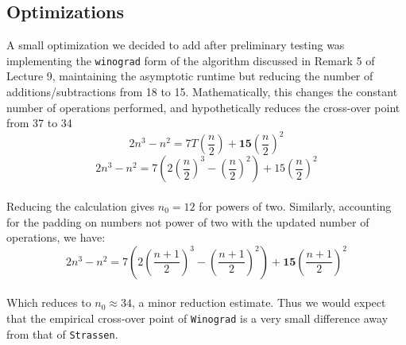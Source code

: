 \documentclass[11pt]{scrartcl}
\theoremstyle{dotlessP}
\theoremstyle{dotlessN}
\theoremstyle{dotN}
\begin{document}
\subsection{Optimizations}
A small optimization we decided to add after preliminary testing was implementing the \texttt{winograd} form of the algorithm discussed in Remark 5 of Lecture 9, maintaining the asymptotic runtime but reducing the number of additions/subtractions from 18 to 15. Mathematically, this changes the constant number of operations performed, and hypothetically reduces the cross-over point from 37 to 34\
\[2n^3 - n^2 = 7T(\frac{n}{2})+\textbf{15}(\frac{n}{2})^2\]
\[2n^3-n^2 = 7(2(\frac{n}{2})^3-(\frac{n}{2})^2)+15(\frac{n}{2})^2\]\\

Reducing the calculation gives $n_0 = 12$ for powers of two. 
Similarly, accounting for the padding on numbers not power of two with the updated number of operations, we have: 
\[2n^3 - n^2 = 7(2(\frac{n+1}{2})^3-(\frac{n+1}{2})^2)+\textbf{15}(\frac{n+1}{2})^2\]\\

Which reduces to $n_0 \approx 34$, a minor reduction estimate. Thus we would expect that the empirical cross-over point of \texttt{Winograd} is a very small difference away from that of \texttt{Strassen}.\\
\end{document}
